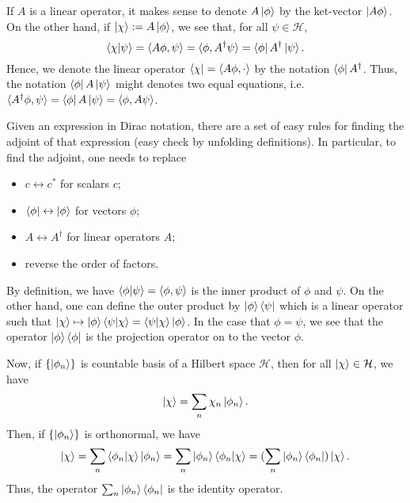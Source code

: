 \documentclass[]{article}
\theoremstyle{definition}
\theoremstyle{definition}
\begin{document}
If \(A\) is a linear operator, it makes sense to denote \(A \ket{\phi}\) by 
the ket-vector \(\ket{A \phi}\). On the other hand, if 
\(\ket{\chi} := A \ket{\phi}\), we see that, for all \(\psi \in \mathcal{H}\),
\[\bra{\chi} \ket{\psi} = \langle A \phi, \psi\rangle = 
  \langle \phi, A^\dagger \psi \rangle = \bra{\phi} A^\dagger \ket{\psi}.\]
Hence, we denote the linear operator \(\bra{\chi} = \langle A\phi, \cdot\rangle\) 
by the notation \(\bra{\phi} A^\dagger\). Thus, the notation \(\bra{\phi} A \ket{\psi}\)
might denotes two equal equations, i.e. 
\(\langle A^\dagger \phi, \psi \rangle = \bra{\phi} A \ket{\psi} = 
\langle \phi, A \psi \rangle\).

Given an expression in Dirac notation, there are a set of easy rules for finding 
the adjoint of that expression (easy check by unfolding definitions). In particular,
to find the adjoint, one needs to replace
\begin{itemize}
  \item \(c \leftrightarrow c^*\) for scalars \(c\);
  \item \(\bra{\phi} \leftrightarrow \ket{\phi}\) for vectors \(\phi\);
  \item \(A \leftrightarrow A^\dagger\) for linear operators \(A\);
  \item reverse the order of factors.
\end{itemize}

By definition, we have \(\bra{\phi}\ket{\psi} = \langle \phi, \psi \rangle\) 
is the inner product of \(\phi\) and \(\psi\). On the other hand, one can define 
the outer product by \(\ket{\phi} \bra{\psi}\) which is a linear operator such 
that \(\ket{\chi} \mapsto \ket{\phi}\bra{\psi}\ket{\chi} = \bra{\psi}\ket{\chi}\ket{\phi}\). 
In the case that \(\phi = \psi\), we see that the operator \(\ket{\phi} \bra{\phi}\) 
is the projection operator on to the vector \(\phi\).

Now, if \(\{\ket{\phi_n}\}\) is countable basis of a Hilbert space \(\mathcal{H}\), 
then for all \(\ket{\chi} \in \mathcal{H}\), we have 
\[\ket{\chi} = \sum_n \chi_n \ket{\phi_n}.\]
Then, if \(\{\ket{\phi_n}\}\) is orthonormal, we have 
\[\ket{\chi} = \sum_n \bra{\phi_n}\ket{\chi} \ket{\phi_n} = 
  \sum_n \ket{\phi_n} \bra{\phi_n} \ket{\chi} = 
  (\sum_n \ket{\phi_n} \bra{\phi_n}) \ket{\chi}.\]
Thus, the operator \(\sum_n \ket{\phi_n} \bra{\phi_n}\) is the identity operator.
\end{document}
